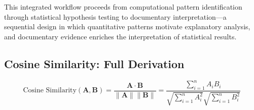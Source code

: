 This integrated workflow proceeds from computational pattern identification through statistical hypothesis testing to documentary interpretation---a sequential design in which quantitative patterns motivate explanatory analysis, and documentary evidence enriches the interpretation of statistical results.

\subsection{Cosine Similarity: Full Derivation}
\begin{equation}
\text{Cosine Similarity}(\mathbf{A}, \mathbf{B}) = \frac{\mathbf{A} \cdot \mathbf{B}}{\|\mathbf{A}\| \|\mathbf{B}\|} = \frac{\sum_{i=1}^{n} A_i B_i}{\sqrt{\sum_{i=1}^{n} A_i^2} \sqrt{\sum_{i=1}^{n} B_i^2}}
\end{equation}
